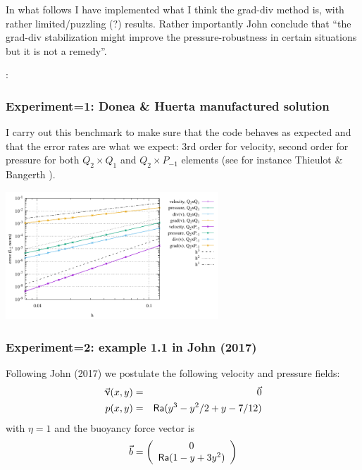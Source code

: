 In what follows I have implemented what I think the grad-div method is, with 
rather limited/puzzling (?) results.
Rather importantly John \etal conclude that ``the
grad-div stabilization might improve the pressure-robustness in certain situations but
it is not a remedy''. 

\Literature: \cite{ollh09}

\subsubsection*{Experiment=1: Donea \& Huerta manufactured solution}

I carry out this benchmark to make sure that the code behaves as expected and that the
error rates are what we expect: 3rd order for velocity, second order for pressure 
for both $Q_2\times Q_1$ and $Q_2\times P_{-1}$ elements (see for instance 
Thieulot \& Bangerth \cite{thba22}).

\begin{center}
\includegraphics[width=8cm]{python_codes/fieldstone_104/results/exp1/errors.pdf}
\end{center}


\subsubsection*{Experiment=2: example 1.1 in John \etal (2017)}
Following John \etal (2017) \cite{jolm17} we 
postulate the following velocity and pressure fields:
\begin{eqnarray}
\vec{\upnu}(x,y) &=& \vec{0} \nonumber\\
p(x,y) &=& {\mathsf{Ra}} ( y^3-y^2/2+y-7/12 ) \nonumber
\end{eqnarray}
with $\eta=1$ and the buoyancy force vector is
\[
\vec{b}=
\left(
\begin{array}{c}
0 \\ {\mathsf{Ra}}(1-y+3y^2)
\end{array}
\right)
\]

